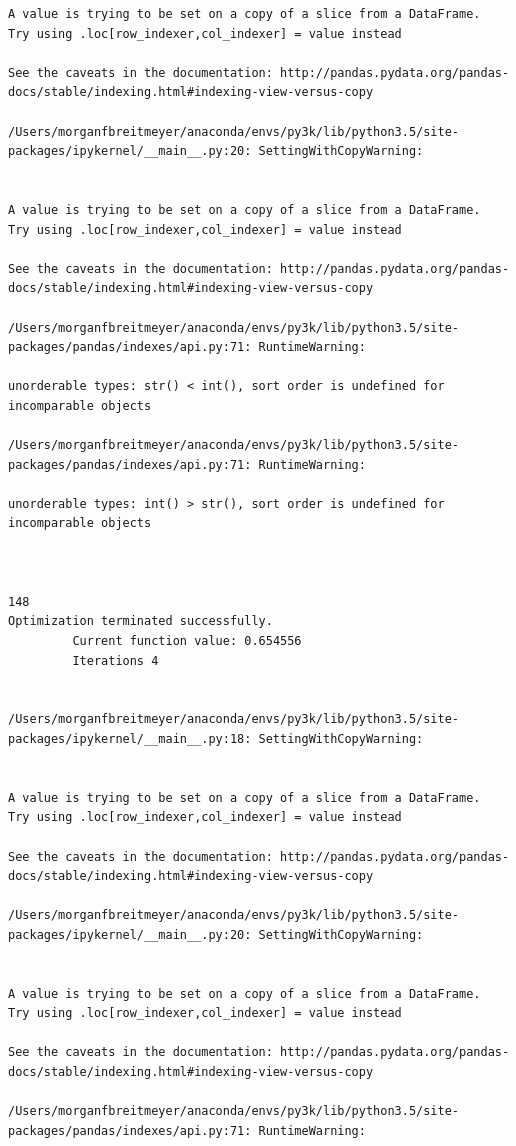 \begin{lstlisting}
A value is trying to be set on a copy of a slice from a DataFrame.
Try using .loc[row_indexer,col_indexer] = value instead

See the caveats in the documentation: http://pandas.pydata.org/pandas-docs/stable/indexing.html#indexing-view-versus-copy

/Users/morganfbreitmeyer/anaconda/envs/py3k/lib/python3.5/site-packages/ipykernel/__main__.py:20: SettingWithCopyWarning:


A value is trying to be set on a copy of a slice from a DataFrame.
Try using .loc[row_indexer,col_indexer] = value instead

See the caveats in the documentation: http://pandas.pydata.org/pandas-docs/stable/indexing.html#indexing-view-versus-copy

/Users/morganfbreitmeyer/anaconda/envs/py3k/lib/python3.5/site-packages/pandas/indexes/api.py:71: RuntimeWarning:

unorderable types: str() < int(), sort order is undefined for incomparable objects

/Users/morganfbreitmeyer/anaconda/envs/py3k/lib/python3.5/site-packages/pandas/indexes/api.py:71: RuntimeWarning:

unorderable types: int() > str(), sort order is undefined for incomparable objects



148
Optimization terminated successfully.
         Current function value: 0.654556
         Iterations 4


/Users/morganfbreitmeyer/anaconda/envs/py3k/lib/python3.5/site-packages/ipykernel/__main__.py:18: SettingWithCopyWarning:


A value is trying to be set on a copy of a slice from a DataFrame.
Try using .loc[row_indexer,col_indexer] = value instead

See the caveats in the documentation: http://pandas.pydata.org/pandas-docs/stable/indexing.html#indexing-view-versus-copy

/Users/morganfbreitmeyer/anaconda/envs/py3k/lib/python3.5/site-packages/ipykernel/__main__.py:20: SettingWithCopyWarning:


A value is trying to be set on a copy of a slice from a DataFrame.
Try using .loc[row_indexer,col_indexer] = value instead

See the caveats in the documentation: http://pandas.pydata.org/pandas-docs/stable/indexing.html#indexing-view-versus-copy

/Users/morganfbreitmeyer/anaconda/envs/py3k/lib/python3.5/site-packages/pandas/indexes/api.py:71: RuntimeWarning:


\end{lstlisting}
